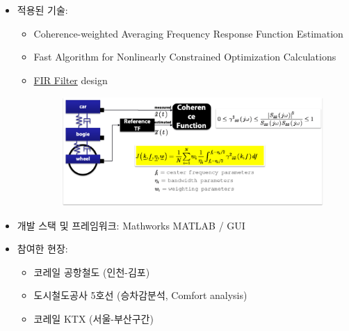 \begin{itemize}[label=]
\begin{itemize}[label=]
		      \item 적용된 기술:
		            \begin{itemize}
			            \item Coherence-weighted Averaging Frequency Response Function Estimation
			            \item Fast Algorithm for Nonlinearly Constrained Optimization Calculations
			            \item \href{https://en.wikipedia.org/wiki/Finite_impulse_response}{FIR Filter} design
			                  \begin{figure}[ht]
				                  \begin{fullwidth}
					                  \centering
					                  \includegraphics[width=1\textwidth] {images/arex_04.png}
				                  \end{fullwidth}
			                  \end{figure}
		            \end{itemize}
		      \item 개발 스택 및 프레임워크: Mathworks MATLAB / GUI
		      \item 참여한 현장:
		            \begin{itemize}
			            \item 코레일 공항철도 (인천-김포)
			            \item 도시철도공사 5호선 (승차감분석, Comfort analysis)
			            \item 코레일 KTX (서울-부산구간)
		            \end{itemize}
	      \end{itemize}
\end{itemize}


